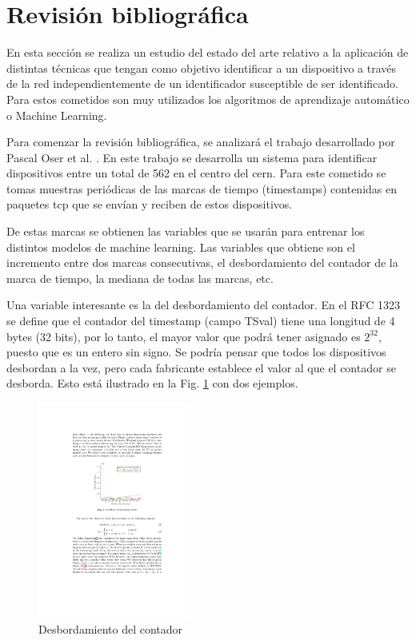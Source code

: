 \section{Revisión bibliográfica}

En esta sección se realiza un estudio del estado del arte relativo a la aplicación de distintas técnicas que tengan como objetivo identificar a un dispositivo a través de la red independientemente de un identificador susceptible de ser identificado. Para estos cometidos son muy utilizados los algoritmos de aprendizaje automático o Machine Learning. 

Para comenzar la revisión bibliográfica, se analizará el trabajo desarrollado por Pascal Oser et al. \cite{oser2018identifying}. En este trabajo se desarrolla un sistema para identificar dispositivos entre un total de 562 en el centro del \acrfull{cern}. Para este cometido se tomas muestras periódicas de las marcas de tiempo (timestamps) contenidas en paquetes \acrshort{tcp} que se envían y reciben de estos dispositivos.

De estas marcas se obtienen las variables que se usarán para entrenar los distintos modelos de machine learning. Las variables que obtiene son el incremento entre dos marcas consecutivas, el desbordamiento del contador de la marca de tiempo, la mediana de todas las marcas, etc.

Una variable interesante es la del desbordamiento del contador. En el RFC 1323 \cite{RFC1323} se define que el contador del timestamp (campo TSval) tiene una longitud de 4 bytes (32 bits), por lo tanto, el mayor valor que podrá tener asignado es $2^{32}$, puesto que es un entero sin signo. Se podría pensar que todos los dispositivos desbordan a la vez, pero cada fabricante establece el valor al que el contador se desborda. Esto está ilustrado en la Fig. \ref{fig:cern_ts_overflow} con dos ejemplos.

\begin{figure}[htpb!]
    \centering
    \includegraphics[width=0.45\textwidth]{images/CERN-timestamp_overflow}
    \caption{Desbordamiento del contador \cite{oser2018identifying}}
    \label{fig:cern_ts_overflow}
\end{figure}

